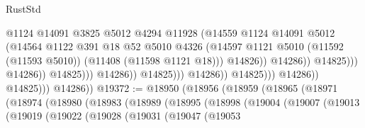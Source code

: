 \begin{lexlean}{RustStd}
\begin{coremodule}
                                                          @1124
                                                          @14091
                                                          @3825
                                                          @5012
                                                          @4294
                                                          @11928
                                                          (@14559
                                                            @1124
                                                            @14091
                                                            @5012
                                                            (@14564
                                                              @1122
                                                              @391
                                                              @18
                                                              @52
                                                              @5010
                                                              @4326
                                                              (@14597
                                                                @1121
                                                                @5010
                                                                (@11592 (@11593 @5010))
                                                                (@11408 (@11598 @1121 @18)))
                                                              @14826))
                                                          @14286))
                                                      @14825)))
                                                @14286))
                                            @14825)))
                                      @14286))
                                  @14825)))
                            @14286))
                        @14825)))
                  @14286))
              @14825)))
        @14286))
@19372 := @18950
    (@18956
      (@18959
        (@18965
          (@18971
            (@18974
              (@18980
                (@18983
                  (@18989
                    (@18995
                      (@18998
                        (@19004
                          (@19007
                            (@19013
                              (@19019
                                (@19022
                                  (@19028
                                    (@19031
                                      (@19047
                                        (@19053

\end{coremodule}
\end{lexlean}
